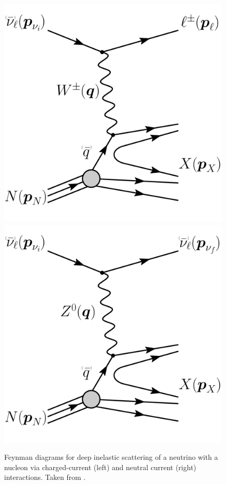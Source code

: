 \begin{figure}[h]
    \centering
    \includegraphics[width=0.4\linewidth]{figures/neutrinos_properties/feynman_DIS_CC_nu_new.pdf}
    \hspace{0.8cm}
    \includegraphics[width=0.4\linewidth]{figures/neutrinos_properties/feynman_DIS_NC_nu_new.pdf}
    \caption[Neutrino-nucleon deep inelastic scattering, taken from \cite{ATerliuk}]{Feynman diagrams for deep inelastic scattering of a neutrino with a nucleon via charged-current (left) and neutral current (right) interactions. Taken from \cite{ATerliuk}.}
\end{figure}

